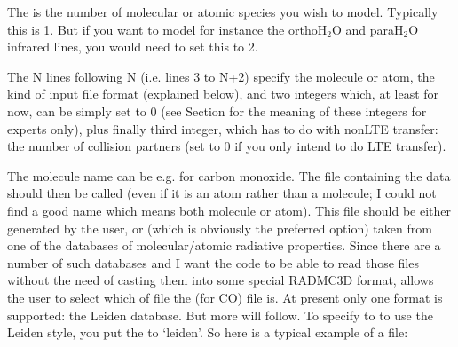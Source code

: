 \documentclass[letterpaper,10pt,english]{sphinxmanual}
\begin{document}
\begin{sphinxVerbatim}[commandchars=\\\{\}]
                                      
                                                
               
               
\end{sphinxVerbatim}

The  is the number of molecular or atomic species you wish to
model. Typically this is 1. But if you want to  model for
instance the ortho\sphinxhyphen{}H$_{\text{2}}$O and para\sphinxhyphen{}H$_{\text{2}}$O infrared lines, you would
need to set this to 2.

The N lines following N (i.e. lines 3 to N+2) specify the molecule or atom, the
kind of input file format (explained below), and two integers which, at least
for now, can be simply set to 0 (see Section {\hyperref[\detokenize{lineradtrans:sec-line-selection}]{}} for the
meaning of these integers \sphinxhyphen{} for experts only), plus finally third integer, which
has to do with non\sphinxhyphen{}LTE transfer: the number of collision partners (set to 0 if
you only intend to do LTE transfer).

The molecule name can be e.g.  for carbon monoxide. The file
containing the data should then be called  (even
if it is an atom rather than a molecule; I could not find a good name which
means both molecule or atom). This file should be either generated by the
user, or (which is obviously the preferred option) taken from one of the
databases of molecular/atomic radiative properties. Since there are a number
of such databases and I want the code to be able to read those files without
the need of casting them into some special RADMC\sphinxhyphen{}3D format,  allows the user to select which  of file
the  (for CO) file is. At present only one
format is supported: the Leiden database. But more will follow. To
specify to  to use the Leiden style, you put the
 to ‘leiden’. So here is a typical example of a
 file:
\end{document}
